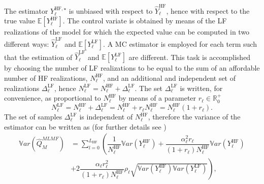 The estimator $Y^{\mathrm{HF},\star}_{\ell}$ is unbiased with respect to $\hat{Y}^{\mathrm{HF}}_{\ell}$, hence with 
respect to the true value $\mathbb{E}\left[Y^{\mathrm{HF}}_{\ell}\right]$.
The control variate is obtained by means of the LF realizations of the model for which the expected value can be 
computed in two different ways: $\hat{Y}^{\mathrm{LF}}_{\ell}$ and $\mathbb{E}\left[Y^{\mathrm{LF}}_{\ell}\right]$. 
A MC estimator is employed for each term such that the estimation of $\hat{Y}^{\mathrm{LF}}_{\ell}$ and 
$\mathbb{E}\left[Y^{\mathrm{LF}}_{\ell}\right]$ are different. This task is accomplished by choosing the number of 
LF realizations to be equal to the sum of an affordable number of HF realizations, $N_{\ell}^{\mathrm{HF}}$, and 
an additional and independent set of realizations $\Delta_{\ell}^{\mathrm{LF}}$, 
hence $N_{\ell}^{\mathrm{LF}} = N_{\ell}^{\mathrm{HF}} + \Delta_{\ell}^{\mathrm{LF}}$. The set $\Delta_{\ell}^{\mathrm{LF}}$ is
written, for convenience, as proportional to $N_{\ell}^{\mathrm{HF}}$ by means of a parameter $r_{\ell} \in \mathbb{R}^+_0$
\begin{equation}
 N_{\ell}^{\mathrm{LF}} = N_{\ell}^{\mathrm{HF}} + \Delta_{\ell}^{\mathrm{LF}} = N_{\ell}^{\mathrm{HF}} + r_{\ell} N_{\ell}^{\mathrm{HF}} 
                        = N_{\ell}^{\mathrm{HF}} (1 + r_{\ell}).
\end{equation}
The set of samples $\Delta_{\ell}^{\mathrm{LF}}$ is independent of $N_{\ell}^{\mathrm{HF}}$, therefore the variance of the 
estimator can be written as (for further details see \cite{GeraciCTR})
\begin{equation}\label{EQ: MLMF mean}
\begin{split}
\mathbb{V}ar\left(\hat{Q}_M^{MLMF}\right) &= \sum_{l=0}^{L_{\mathrm{HF}}} \left( \dfrac{1}{N_{\ell}^{\mathrm{HF}}} \mathbb{V}ar\left(Y^{\mathrm{HF}}_{\ell}\right) 
                                          + \dfrac{\alpha_\ell^2 r_\ell}{(1+r_\ell) N_{\ell}^{\mathrm{HF}}} \mathbb{V}ar\left(Y^{\mathrm{HF}}_{\ell}\right) \right. \\
              &+  \left. 2 \dfrac{\alpha_\ell r_\ell^2}{(1+r_\ell) N_{\ell}^{\mathrm{HF}}} \rho_\ell \sqrt{ \mathbb{V}ar\left(Y^{\mathrm{HF}}_{\ell}\right) 
                                                                                                      \mathbb{V}ar\left(Y^{\mathrm{LF}}_{\ell}\right) } \right),
\end{split}
\end{equation}

